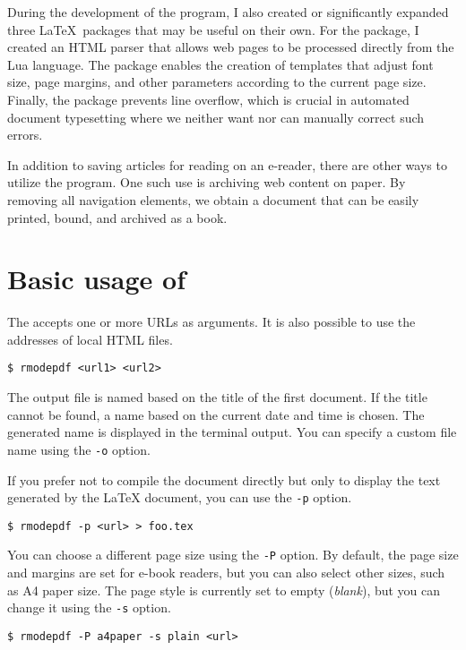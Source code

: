 \documentclass{ltugboat}
\newcommand\program[1]{\tbcode{#1}}
\begin{document}
During the development of the program, I also created or significantly expanded
three \LaTeX\ packages that may be useful on their own. For the 
package, I created an HTML parser that allows web pages to be processed
directly from the Lua language. The  package enables the
creation of templates that adjust font size, page margins, and other parameters
according to the current page size. Finally, the  package
prevents line overflow, which is crucial in automated document typesetting
where we neither want nor can manually correct such errors.

In addition to saving articles for reading on an e-reader, there are other ways
to utilize the \program{Rmodepdf} program. One such use is archiving web
content on paper. By removing all navigation elements, we obtain a document
that can be easily printed, bound, and archived as a book.

\section{Basic usage of \program{Rmodepdf}}

The \program{Rmodepdf} accepts one or more URLs as arguments. It is also
possible to use the addresses of local HTML files.

\begin{verbatim}
$ rmodepdf <url1> <url2>
\end{verbatim}


The output file is named based on the title of the first document. If the title
cannot be found, a name based on the current date and time is chosen. The
generated name is displayed in the terminal output. You can specify a custom
file name using the \texttt{-o} option.

If you prefer not to compile the document directly but only to display the text
generated by the LaTeX document, you can use the \texttt{-p} option.

\begin{verbatim}
$ rmodepdf -p <url> > foo.tex
\end{verbatim}

You can choose a different page size using the \texttt{-P} option. By default,
the page size and margins are set for e-book readers, but you can also select
other sizes, such as A4 paper size. The page style is currently set to empty
(\textit{blank}), but you can change it using the \texttt{-s} option.

\begin{verbatim}
$ rmodepdf -P a4paper -s plain <url>
\end{verbatim}
\end{document}
